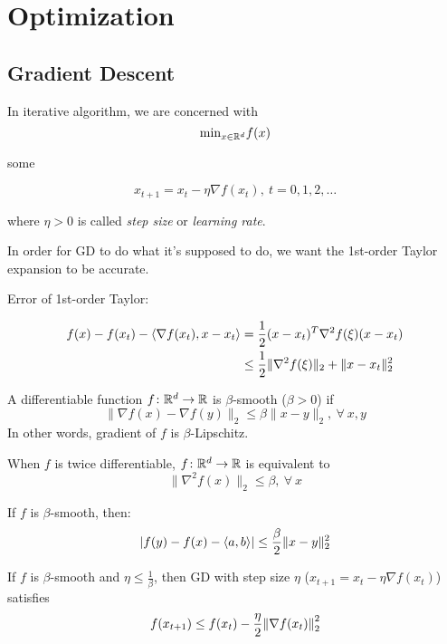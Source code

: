 \part{Optimization}

\chapter{Gradient Descent}

In iterative algorithm, we are concerned with 
\[
   \text{min}_{x \in \mathbb{R}^d} f(x)  
\]


some 


\[
    x_{t+1} = x_t - \eta \nabla f(x_t), \ t = 0,1,2,\ldots
\]

where \(\eta > 0\) is called \emph{step size} or \emph{learning rate}. 

In order for GD to do what it's supposed to do, we want the 1st-order Taylor expansion to be 
accurate. 

Error of 1st-order Taylor: 


\begin{align*}
    f(x) - f(x_t) -  \langle \nabla f(x_t), x - x_t \rangle &= \frac{1}{2} (x - x_t)^T \nabla^2 f(\xi) (x - x_t) \\ 
    & \leq \frac{1}{2} \lVert \nabla^2 f(\xi)\rVert_2 + \lVert x - x_t\rVert_2^2
\end{align*}

\begin{definition}[smoothness]
    A differentiable function \(f \colon \mathbb{R}^d \to \mathbb{R}\) is \(\beta\)-smooth (\(\beta > 0\)) if 
    \[
        \lVert \nabla f(x) - \nabla f(y)\rVert_2 \leq \beta\lVert x - y\rVert_2, \ \forall \ x, y   
    \]
    In other words, gradient of \(f\) is \(\beta\)-Lipschitz. 
\end{definition}

\begin{remark}
    When \(f\) is twice differentiable, \(f \colon \mathbb{R}^d \to \mathbb{R}\) is equivalent to 
    \[
        \lVert \nabla^2 f(x)\rVert_2 \leq \beta, \ \forall \ x   
    \]
\end{remark}

\begin{lemma}
    If \(f\) is \(\beta\)-smooth, then: 
    \[
        \lvert  f(y) - f(x) - \langle a, b \rangle \rvert  \leq \frac{\beta}{2} \lVert x - y\rVert_2^2  
    \]
\end{lemma}


\begin{lemma}
    If \(f\) is \(\beta\)-smooth and \(\eta \leq \frac{1}{\beta}\), then GD with 
    step size \(\eta\) (\(x_{t+1} = x_t - \eta \nabla f(x_t)\)) satisfies 
    \[
        f(x_{t+1}) \leq f(x_t) - \frac{\eta}{2} \norm{\nabla f(x_t)}_2^2 
    \]
\end{lemma}

